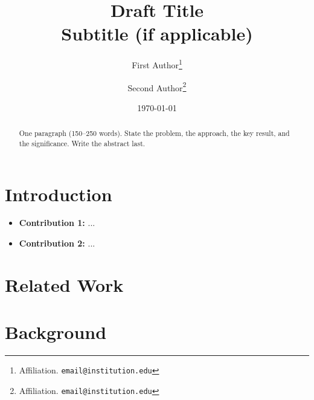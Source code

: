 \documentclass[12pt, a4paper]{article}
\title{%
  \textbf{Draft Title}\\
  \large Subtitle (if applicable)
}
\author{%
  First Author\thanks{Affiliation. \texttt{email@institution.edu}} \and
  Second Author\thanks{Affiliation. \texttt{email@institution.edu}}
}
\date{\today}
\begin{document}

\maketitle

\begin{abstract}
  One paragraph (150--250 words).
  State the problem, the approach, the key result, and the significance.
  Write the abstract last.
\end{abstract}

\tableofcontents
\newpage

\section{Introduction}
\label{sec:introduction}


\begin{itemize}
  \item \textbf{Contribution 1:} ...
  \item \textbf{Contribution 2:} ...
\end{itemize}

\section{Related Work}
\label{sec:related}


\section{Background}
\label{sec:background}

\end{document}
